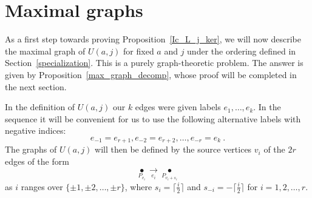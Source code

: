 \documentclass{amsproc}
\theoremstyle{definition}
\theoremstyle{remark}
\numberwithin{equation}{section}
\begin{document}
\section{Maximal graphs} \label{sect.maximal}

As a first step towards proving Proposition~\ref{Ic_L_j_ker}, we will now describe the maximal graph of $U(a,j)$ for fixed $a$ and $j$
under the ordering defined in Section~\ref{specialization}. This is a purely graph-theoretic problem. The answer is given by 
Proposition~\ref{max_graph_decomp}, whose proof will be completed in the next section.

In the definition of $U(a,j)$ our $k$ edges were given labels $e_1,\dots,e_k$. 
In the sequence it will be convenient for us to use the following alternative labels with negative indices:
\[e_{-1}=e_{r+1},e_{-2}=e_{r+2},\dots,e_{-r}=e_k\ .\]
The graphs of $U(a,j)$ will then be defined by the source vertices $v_i$ of the $2r$ edges of the form
\[\underset {P_{v_i}} \bullet \underset {e_i} \longrightarrow \underset {P_{v_i+s_i}} \bullet\]
as $i$ ranges over $\{\pm 1,\pm 2,\dots,\pm r\}$, where $s_i=\lceil \frac i 2 \rceil$ and $s_{-i}=-\lceil \frac i 2 \rceil$ for $i=1,2,\dots,r$.
\end{document}
